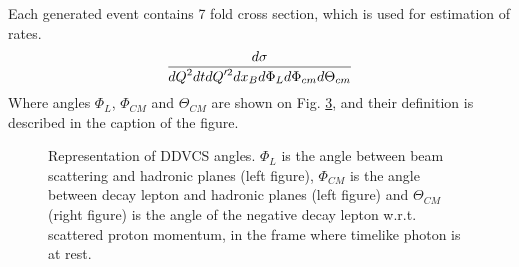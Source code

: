 Each generated event contains 7 fold cross section, which is used for estimation of rates.
\begin{equation}
\frac{\displaystyle d\sigma}{\displaystyle dQ^{2} dt dQ^{\prime 2} dx_{B} d\Phi_{L} d\Phi_{cm} d\Theta_{cm}} 
\end{equation}
Where angles $\Phi_{L}$, $\Phi_{CM}$ and $\Theta_{CM}$ are shown on Fig. \ref{fig:DDVCS_Angles}, and their definition is described in the caption
of the figure.
\begin{figure}[!htb]
 \centering
 \begin{subfigure}{0.48 \tw}
  \caption{}
  \label{fig:DDVCS_Angles1}
 \end{subfigure}
 \begin{subfigure}{0.48 \tw}
  \caption{}
  \label{fig:DDVCS_Angles2}
 \end{subfigure}
\caption{Representation of DDVCS angles. $\Phi_{L}$ is the angle between beam scattering and hadronic planes (left figure), $\Phi_{CM}$ 
is the angle between decay lepton and hadronic planes (left figure) and $\Theta_{CM}$ (right figure) is the angle of the negative
decay lepton w.r.t. scattered proton momentum, in the frame where timelike photon is at rest.}
\label{fig:DDVCS_Angles}
\end{figure}

